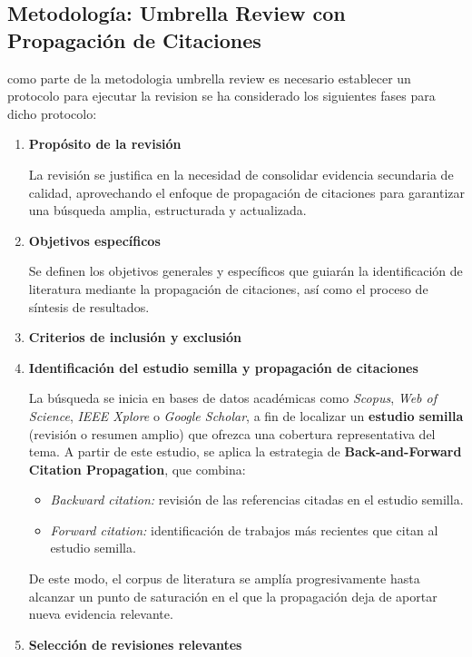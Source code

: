 \subsection*{Metodología: Umbrella Review con Propagación de Citaciones}
como parte de la metodologia umbrella review es necesario establecer un protocolo para ejecutar la revision 
se ha considerado los siguientes fases para dicho protocolo:
\begin{enumerate}
    \item \textbf{Propósito de la revisión}  
    
    La revisión se justifica en la necesidad de consolidar evidencia secundaria de calidad, aprovechando el enfoque de propagación de citaciones para garantizar una búsqueda amplia, estructurada y actualizada.

    \item \textbf{Objetivos específicos}  

    Se definen los objetivos generales y específicos que guiarán la identificación de literatura mediante la propagación de citaciones, así como el proceso de síntesis de resultados.

    \item \textbf{Criterios de inclusión y exclusión}  

    
    \item \textbf{Identificación del estudio semilla y propagación de citaciones}  
    
    La búsqueda se inicia en bases de datos académicas como \textit{Scopus}, \textit{Web of Science}, \textit{IEEE Xplore} o \textit{Google Scholar}, a fin de localizar un \textbf{estudio semilla} (revisión o resumen amplio) que ofrezca una cobertura representativa del tema.  
    A partir de este estudio, se aplica la estrategia de \textbf{Back-and-Forward Citation Propagation}, que combina:  
    \begin{itemize}
        \item \textit{Backward citation:} revisión de las referencias citadas en el estudio semilla.  
        \item \textit{Forward citation:} identificación de trabajos más recientes que citan al estudio semilla.  
    \end{itemize}
    De este modo, el corpus de literatura se amplía progresivamente hasta alcanzar un punto de saturación en el que la propagación deja de aportar nueva evidencia relevante.

    \item \textbf{Selección de revisiones relevantes}  


\end{enumerate}
